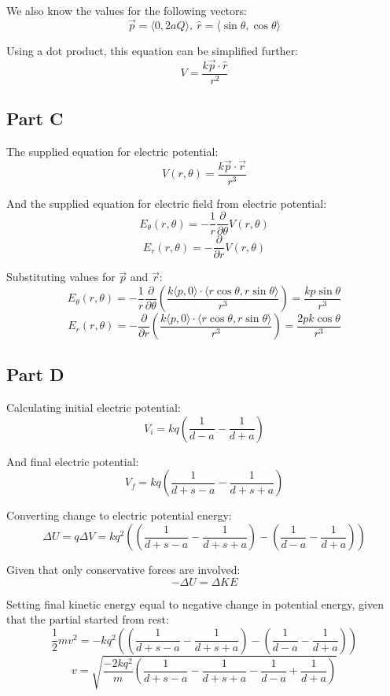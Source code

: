 \documentclass{article}
\begin{document}
We also know the values for the following vectors:
$$ \vec{p} = \langle 0, 2aQ \rangle,\ \hat{r} = \langle \sin \theta, \cos \theta
\rangle $$

Using a dot product, this equation can be simplified further:
$$ V = \frac{ k \vec{p} \cdot \hat{r} }{ r^{2} } $$

\subsection*{Part C}

The supplied equation for electric potential:
$$ V(r, \theta) = \frac{ k \vec{p} \cdot \vec{r} }{ r^{3} } $$

And the supplied equation for electric field from electric potential:
$$ E_{\theta}(r, \theta) = -\frac{ 1 }{ r } \frac{ \partial}{ \partial \theta }
V(r, \theta) $$
$$ E_{r}(r, \theta) = -\frac{ \partial }{ \partial r } V(r, \theta) $$

Substituting values for $\vec{p}$ and $\vec{r}$:
$$ E_{\theta}(r, \theta) = -\frac{ 1 }{ r } \frac{ \partial }{ \partial \theta }
\left( \frac{ k \langle p, 0 \rangle \cdot \langle r \cos \theta, r \sin \theta
\rangle }{ r^{3} } \right) = \frac{ kp \sin \theta }{ r^{3} }$$
$$ E_{r}(r, \theta) = -\frac{ \partial }{ \partial r } \left( \frac{ k \langle p, 0
\rangle \cdot \langle r \cos \theta, r \sin \theta \rangle}{ r^{3} } \right) =
\frac{ 2 p k \cos \theta }{ r^{3} }$$

\subsection*{Part D}

Calculating initial electric potential:
$$ V_{i} = kq \left( \frac{ 1 }{ d - a } - \frac{ 1 }{ d + a } \right) $$

And final electric potential:
$$ V_{f} = kq \left( \frac{ 1 }{ d + s - a } - \frac{ 1 }{ d + s + a } \right) $$

Converting change to electric potential energy:
$$ \Delta U = q \Delta V = k q^{2} \left( \left( \frac{ 1 }{ d + s - a } -
\frac{ 1 }{ d + s + a } \right) - \left( \frac{ 1 }{ d - a } - \frac{ 1 }{ d + a
} \right)\right) $$

Given that only conservative forces are involved:
$$ -\Delta U = \Delta KE $$

Setting final kinetic energy equal to negative change in potential energy, given
that the partial started from rest:
$$ \frac{ 1 }{ 2 } m v^{2} = -k q^{2} \left( \left( \frac{ 1 }{ d + s - a } -
\frac{ 1 }{ d + s + a } \right) - \left( \frac{ 1 }{ d - a } - \frac{ 1 }{ d + a
} \right)\right) $$
$$ v = \sqrt{\frac{ -2 k q^{2}}{m} \left( \frac{ 1 }{ d + s - a } -
\frac{ 1 }{ d + s + a } - \frac{ 1 }{ d - a } + \frac{ 1 }{ d + a
} \right)} $$
\end{document}

